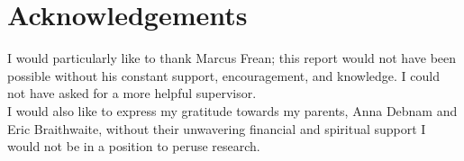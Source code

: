\chapter*{Acknowledgements}
\thispagestyle{empty}
I would particularly like to thank Marcus Frean; this report would not have been possible without his constant support, encouragement, and knowledge. I could not have asked for a more helpful supervisor.\\

I would also like to express my gratitude towards my parents, Anna Debnam and Eric Braithwaite, without their unwavering financial and spiritual support I would not be in a position to peruse research.


